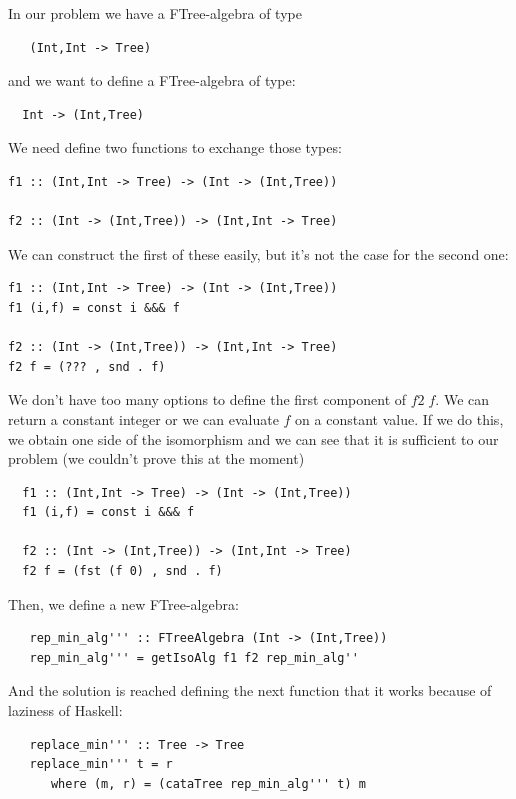 \documentclass[a4paper,10pt]{article}
\begin{document}
In our problem we have a FTree-algebra of type
  
\begin{lstlisting}
   (Int,Int -> Tree)
\end{lstlisting}

\noindent and we want to define a FTree-algebra of type:

\begin{lstlisting}
  Int -> (Int,Tree)
\end{lstlisting} 

We need define two functions to exchange those types:
  
\begin{lstlisting}
f1 :: (Int,Int -> Tree) -> (Int -> (Int,Tree))
  
f2 :: (Int -> (Int,Tree)) -> (Int,Int -> Tree)
\end{lstlisting}

We can construct the first of these easily, but it's not the case for the second one:

\begin{lstlisting}
f1 :: (Int,Int -> Tree) -> (Int -> (Int,Tree))
f1 (i,f) = const i &&& f

f2 :: (Int -> (Int,Tree)) -> (Int,Int -> Tree)
f2 f = (??? , snd . f)
\end{lstlisting}

We don't have too many options to define the first component of $f2\;f$. We can
return a constant integer or we can evaluate $f$ on a constant value. If we do this,
we obtain one side of the isomorphism and we can see that it is sufficient to our problem
(we couldn't prove this at the moment)

  \begin{lstlisting}
  f1 :: (Int,Int -> Tree) -> (Int -> (Int,Tree))
  f1 (i,f) = const i &&& f

  f2 :: (Int -> (Int,Tree)) -> (Int,Int -> Tree)
  f2 f = (fst (f 0) , snd . f)
  \end{lstlisting}

  Then, we define a new FTree-algebra:
  
  \begin{lstlisting}
   rep_min_alg''' :: FTreeAlgebra (Int -> (Int,Tree))
   rep_min_alg''' = getIsoAlg f1 f2 rep_min_alg''
  \end{lstlisting}

  And the solution is reached defining the next function that it works because of laziness of Haskell:
  
  \begin{lstlisting}
   replace_min''' :: Tree -> Tree
   replace_min''' t = r
      where (m, r) = (cataTree rep_min_alg''' t) m
  \end{lstlisting}
\end{document}

